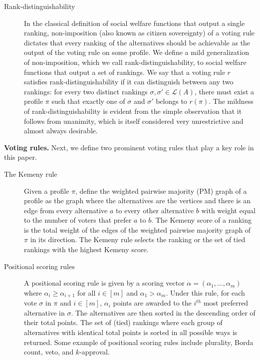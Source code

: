 \documentclass[prodmode,acmec]{ec-acmsmall}
\newcommand{\calL}{{\mathcal{L}}}
\newcommand{\rank}{{\calL(A)}}
\begin{document}
\begin{description}
\item[Rank-distinguishability] In the classical definition of social welfare functions that output a single ranking, non-imposition (also known as citizen sovereignty) of a voting rule dictates that every ranking of the alternatives should be achievable as the output of the voting rule on some profile. We define a mild generalization of non-imposition, which we call rank-distinguishability, to social welfare functions that output a set of rankings. We say that a voting rule $r$ satisfies rank-distinguishability if it can distinguish between any two rankings: for every two distinct rankings $\sigma, \sigma' \in \rank$, there must exist a profile $\pi$ such that exactly one of $\sigma$ and $\sigma'$ belongs to $r(\pi)$. The mildness of rank-distinguishability is evident from the simple observation that it follows from unanimity, which is itself considered very unrestrictive and almost always desirable. 
\end{description}


\noindent \textbf{Voting rules.} Next, we define two prominent voting rules that play a key role in this paper. 
\begin{description}

\item[The Kemeny rule] Given a profile $\pi$, define the weighted pairwise majority (PM) graph of a profile as the graph where the alternatives are the vertices and there is an edge from every alternative $a$ to every other alternative $b$ with weight equal to the number of voters that prefer $a$ to $b$. The Kemeny score of a ranking is the total weight of the edges of the weighted pairwise majority graph of $\pi$ in its direction. The Kemeny rule selects the ranking or the set of tied rankings with the highest Kemeny score.\\

\item[Positional scoring rules] A positional scoring rule is given by a scoring vector $\alpha = (\alpha_1,\ldots,\alpha_m)$ where $\alpha_i \ge \alpha_{i+1}$ for all $i \in [m]$ and $\alpha_1 > \alpha_m$. Under this rule, for each vote $\sigma$ in $\pi$ and $i \in [m]$, $\alpha_i$ points are awarded to the $i^{th}$ most preferred alternative in $\sigma$. The alternatives are then sorted in the descending order of their total points. The set of (tied) rankings where each group of alternatives with identical total points is sorted in all possible ways is returned. Some example of positional scoring rules include plurality, Borda count, veto, and $k$-approval.

\end{description}
\end{document}
